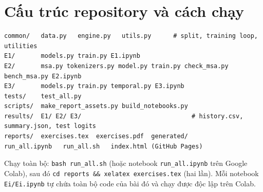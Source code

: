 \documentclass[twoside,final]{hcmut-report}
\begin{document}
\appendix
\section{Cấu trúc repository và cách chạy}
\begin{lstlisting}[language={},caption={Cấu trúc repository}]
common/   data.py   engine.py   utils.py      # split, training loop, utilities
E1/       models.py train.py E1.ipynb
E2/       msa.py tokenizers.py model.py train.py check_msa.py bench_msa.py E2.ipynb
E3/       models.py train.py temporal.py E3.ipynb
tests/    test_all.py
scripts/  make_report_assets.py build_notebooks.py
results/  E1/ E2/ E3/                              # history.csv, summary.json, test logits
reports/  exercises.tex  exercises.pdf  generated/
run_all.ipynb   run_all.sh   index.html (GitHub Pages)
\end{lstlisting}
Chạy toàn bộ: \texttt{bash run\_all.sh} (hoặc notebook \texttt{run\_all.ipynb} trên Google Colab), sau đó \texttt{cd reports \&\& xelatex exercises.tex} (hai lần). Mỗi notebook \texttt{Ei/Ei.ipynb} tự chứa toàn bộ code của bài đó và chạy được độc lập trên Colab.
\end{document}
